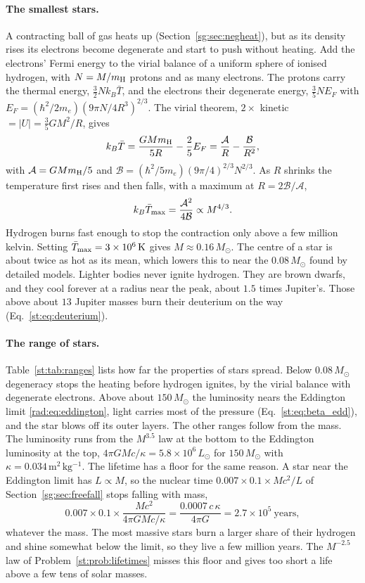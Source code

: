 \paragraph{The smallest stars.} A contracting ball of gas heats up (Section~\ref{sg:sec:negheat}), but as its density rises its electrons become degenerate and start to push without heating. Add the electrons' Fermi energy to the virial balance of a uniform sphere of ionised hydrogen, with $N=M/m_{\rm H}$ protons and as many electrons. The protons carry the thermal energy, $\tfrac32Nk_B\bar T$, and the electrons their degenerate energy, $\tfrac35NE_F$ with $E_F=(\hbar^2/2m_e)(9\pi N/4R^3)^{2/3}$. The virial theorem, $2\times$ kinetic $=|U|=\tfrac35GM^2/R$, gives
\begin{equation}
	k_B\bar T=\frac{G M m_{\rm H}}{5R}-\frac{2}{5}E_F=\frac{\mathcal A}{R}-\frac{\mathcal B}{R^2},
\end{equation}
with $\mathcal A=GMm_{\rm H}/5$ and $\mathcal B=(\hbar^2/5m_e)(9\pi/4)^{2/3}N^{2/3}$. As $R$ shrinks the temperature first rises and then falls, with a maximum at $R=2\mathcal B/\mathcal A$,
\begin{equation}
	k_B\bar T_{\rm max}=\frac{\mathcal A^2}{4\mathcal B}\propto M^{4/3}.
\end{equation}
Hydrogen burns fast enough to stop the contraction only above a few million kelvin. Setting $\bar T_{\rm max}=3\times10^6\,\mathrm K$ gives $M\approx0.16\,M_\odot$. The centre of a star is about twice as hot as its mean, which lowers this to near the $0.08\,M_\odot$ found by detailed models. Lighter bodies never ignite hydrogen. They are brown dwarfs, and they cool forever at a radius near the peak, about $1.5$ times Jupiter's. Those above about $13$ Jupiter masses burn their deuterium on the way (Eq.~\eqref{st:eq:deuterium}).

\paragraph{The range of stars.} Table~\ref{st:tab:ranges} lists how far the properties of stars spread. Below $0.08\,M_\odot$ degeneracy stops the heating before hydrogen ignites, by the virial balance with degenerate electrons. Above about $150\,M_\odot$ the luminosity nears the Eddington limit \eqref{rad:eq:eddington}, light carries most of the pressure (Eq.~\eqref{st:eq:beta_edd}), and the star blows off its outer layers. The other ranges follow from the mass. The luminosity runs from the $M^{3.5}$ law at the bottom to the Eddington luminosity at the top, $4\pi GMc/\kappa=5.8\times10^6\,L_\odot$ for $150\,M_\odot$ with $\kappa=0.034\,\mathrm{m^2\,kg^{-1}}$. The lifetime has a floor for the same reason. A star near the Eddington limit has $L\propto M$, so the nuclear time $0.007\times0.1\times Mc^2/L$ of Section~\ref{sg:sec:freefall} stops falling with mass,
\[
0.007\times0.1\times\frac{Mc^2}{4\pi GMc/\kappa}=\frac{0.0007\,c\,\kappa}{4\pi G}=2.7\times10^5\ \text{years},
\]
whatever the mass. The most massive stars burn a larger share of their hydrogen and shine somewhat below the limit, so they live a few million years. The $M^{-2.5}$ law of Problem~\ref{st:prob:lifetimes} misses this floor and gives too short a life above a few tens of solar masses.

